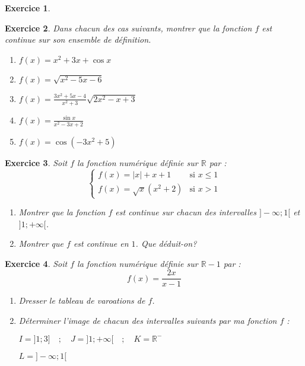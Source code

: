 \documentclass[12pt,a4paper]{article}
\theoremstyle{mystyle}
\newtheorem{exo}{Exercice}
\begin{document}
\begin{multicols*}{2}
\begin{exo}
\end{exo}

\begin{exo}
    Dans chacun des cas suivants, montrer que la fonction $f$ est continue sur son ensemble de définition.
    \begin{enumerate}
        \item $f(x) = x^2 + 3x + \cos{x}$
        \item $f(x) = \sqrt{x^2 - 5x - 6}$
        \item $f(x) = \displaystyle\frac{3x^2 + 5x - 4}{x^2 + 3} \sqrt{2x^2 - x + 3}$
        \item $f(x) = \displaystyle\frac{\sin{x}}{x^2 -3x +2}$
        \item $f(x) = \cos(-3x^2 + 5)$
    \end{enumerate}
\end{exo}

\begin{exo}
    Soit $f$ la fonction numérique définie sur $\mathbb{R}$ par :
    $$
    \begin{cases}
        f(x) = |x| + x + 1 &\text{si } x \leq 1\\
        f(x) = \sqrt{x}(x^2+2) & \text{si } x > 1
    \end{cases}
    $$
    \begin{enumerate}
        \item Montrer que la fonction $f$ est continue sur chacun des intervalles $]-\infty; 1[$ et $]1;+\infty[$.
        \item Montrer que $f$ est continue en $1$. Que déduit-on?
    \end{enumerate}
\end{exo}

\begin{exo}
    Soit $f$ la fonction numérique définie sur $\mathbb{R}-{1}$ par :
    $$f(x) = \frac{2x}{x-1}$$
    \begin{enumerate}
        \item Dresser le tableau de varoations de $f$.
        \item Déterminer l'image de chacun des intervalles suivants par ma fonction $f$ : 
        
        $I = ]1;3]\quad;\quad J = ]1;+\infty[\quad;\quad K = \mathbb{R}^-$
        
        $L = ]-\infty ; 1[$
    \end{enumerate}
\end{exo}



\end{multicols*}
\end{document}
